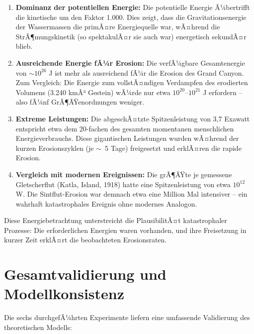 ﻿\documentclass[12pt,a4paper]{report}
\begin{document}
\begin{enumerate}
	\item \textbf{Dominanz der potentiellen Energie:} Die potentielle Energie Ã¼bertrifft die kinetische um den Faktor 1.000. Dies zeigt, dass die Gravitationsenergie der Wassermassen die primÃ¤re Energiequelle war, wÃ¤hrend die StrÃ¶mungskinetik (so spektakulÃ¤r sie auch war) energetisch sekundÃ¤r blieb.
	
	\item \textbf{Ausreichende Energie fÃ¼r Erosion:} Die verfÃ¼gbare Gesamtenergie von $\sim 10^{26}$ J ist mehr als ausreichend fÃ¼r die Erosion des Grand Canyon. Zum Vergleich: Die Energie zum vollstÃ¤ndigen Verdampfen des erodierten Volumens (3.240 kmÂ³ Gestein) wÃ¼rde \glqq nur\grqq{} etwa $10^{20}$--$10^{21}$ J erfordern -- also fÃ¼nf GrÃ¶ÃŸenordnungen weniger.
	
	\item \textbf{Extreme Leistungen:} Die abgeschÃ¤tzte Spitzenleistung von 3,7 Exawatt entspricht etwa dem 20-fachen des gesamten momentanen menschlichen Energieverbrauchs. Diese gigantischen Leistungen wurden wÃ¤hrend der kurzen Erosionszyklen (je $\sim$~5 Tage) freigesetzt und erklÃ¤ren die rapide Erosion.
	
	\item \textbf{Vergleich mit modernen Ereignissen:} Die grÃ¶ÃŸte je gemessene Gletscherflut (Katla, Island, 1918) hatte eine Spitzenleistung von etwa $10^{12}$ W. Die Sintflut-Erosion war demnach etwa eine Million Mal intensiver -- ein wahrhaft katastrophales Ereignis ohne modernes Analogon.
\end{enumerate}

Diese Energiebetrachtung unterstreicht die PlausibilitÃ¤t katastrophaler Prozesse: Die erforderlichen Energien waren vorhanden, und ihre Freisetzung in kurzer Zeit erklÃ¤rt die beobachteten Erosionsraten.

\section{Gesamtvalidierung und Modellkonsistenz}

Die sechs durchgefÃ¼hrten Experimente liefern eine umfassende Validierung des theoretischen Modells:
\end{document}
